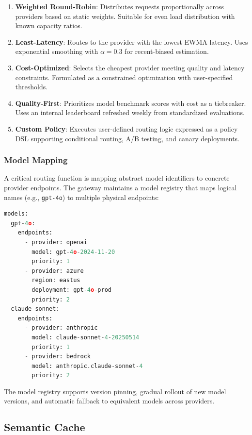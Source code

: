 \begin{enumerate}[leftmargin=*]
    \item \textbf{Weighted Round-Robin}: Distributes requests proportionally across providers based on static weights. Suitable for even load distribution with known capacity ratios.
    \item \textbf{Least-Latency}: Routes to the provider with the lowest EWMA latency. Uses exponential smoothing with $\alpha = 0.3$ for recent-biased estimation.
    \item \textbf{Cost-Optimized}: Selects the cheapest provider meeting quality and latency constraints. Formulated as a constrained optimization with user-specified thresholds.
    \item \textbf{Quality-First}: Prioritizes model benchmark scores with cost as a tiebreaker. Uses an internal leaderboard refreshed weekly from standardized evaluations.
    \item \textbf{Custom Policy}: Executes user-defined routing logic expressed as a policy DSL supporting conditional routing, A/B testing, and canary deployments.
\end{enumerate}

\subsubsection{Model Mapping}

A critical routing function is mapping abstract model identifiers to concrete provider endpoints. The gateway maintains a model registry that maps logical names (e.g., \texttt{gpt-4o}) to multiple physical endpoints:

\begin{lstlisting}[language=Python, caption=Model mapping configuration]
models:
  gpt-4o:
    endpoints:
      - provider: openai
        model: gpt-4o-2024-11-20
        priority: 1
      - provider: azure
        region: eastus
        deployment: gpt-4o-prod
        priority: 2
  claude-sonnet:
    endpoints:
      - provider: anthropic
        model: claude-sonnet-4-20250514
        priority: 1
      - provider: bedrock
        model: anthropic.claude-sonnet-4
        priority: 2
\end{lstlisting}

The model registry supports version pinning, gradual rollout of new model versions, and automatic fallback to equivalent models across providers.

\subsection{Semantic Cache}
\label{sec:caching}

